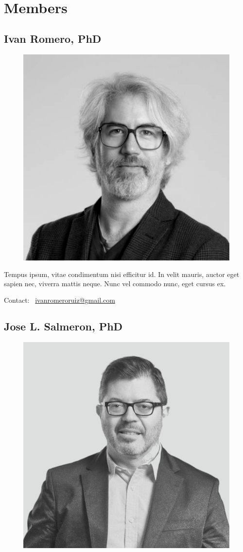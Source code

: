 \section{Members} \label{sec:team}

\subsection{Ivan Romero, PhD}

\begin{figure}[!ht]
  \centering
  \includegraphics[width=.25\textwidth]{../../img/team/romero.png}
  \caption{}
\end{figure}


Tempus ipsum, vitae condimentum nisi efficitur id. In velit mauris, auctor eget
sapien nec, viverra mattis neque. Nunc vel commodo nunc, eget cursus ex.

Contact: \faEnvelope\ \href{mailto:ivanromeroruiz@gmail.com}{ivanromeroruiz@gmail.com}

\subsection{Jose L. Salmeron, PhD}

\begin{figure}[!ht]
  \centering
  \includegraphics[width=.25\textwidth]{../../img/team/salmeron.png}
  \caption{}
\end{figure}

